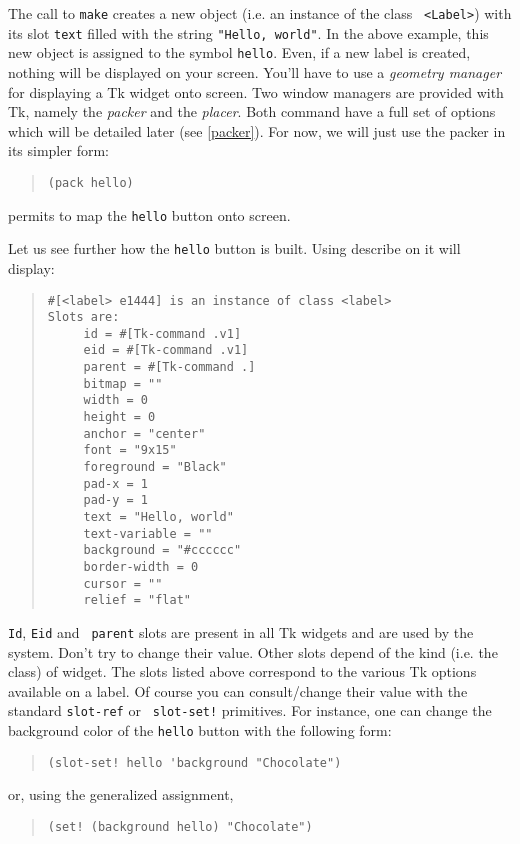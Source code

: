The call to {\tt make} creates a new object (i.e. an instance of the class {\tt
<Label>}) with its slot {\tt text} filled with the string {\tt "Hello,
world"}. In the above example, this new object is assigned to the symbol
{\tt hello}. Even, if a new label is created, nothing will be displayed on
your screen. You'll have to use a {\em geometry manager} for displaying a Tk widget onto screen. Two window managers are
provided with Tk, namely the {\em packer} and the {\em
placer}. Both command have a full set of options which will
be detailed later (see \ref{packer}). For now, we will just use the packer
in its simpler form:
\begin{quote}
\begin{verbatim}        
(pack hello)
\end{verbatim}
\end{quote}
permits to map the {\tt hello} button onto screen. 

Let us see further how the {\tt hello} button is built. Using describe
on it will display:
\begin{quote}
\begin{verbatim}
#[<label> e1444] is an instance of class <label>
Slots are: 
     id = #[Tk-command .v1]
     eid = #[Tk-command .v1]
     parent = #[Tk-command .]
     bitmap = ""
     width = 0
     height = 0
     anchor = "center"
     font = "9x15"
     foreground = "Black"
     pad-x = 1
     pad-y = 1
     text = "Hello, world"
     text-variable = ""
     background = "#cccccc"
     border-width = 0
     cursor = ""
     relief = "flat"
\end{verbatim}
\end{quote}

{\tt Id}, {\tt Eid} and {\tt
parent} slots are present in all Tk widgets and are used
by the system. Don't try to change their value.  Other slots depend of the
kind (i.e. the class) of widget. The slots listed above correspond to
the various Tk options available on a label.  Of course you can
consult/change their value with the standard {\tt slot-ref} or {\tt
slot-set!} primitives.  For instance, one can change the background color
of the {\tt hello} button with the following form:
\begin{quote}
\begin{verbatim}
(slot-set! hello 'background "Chocolate")
\end{verbatim}
\end{quote}
or, using the {\stklos} generalized assignment,
\begin{quote}
\begin{verbatim}
(set! (background hello) "Chocolate")
\end{verbatim}
\end{quote}

